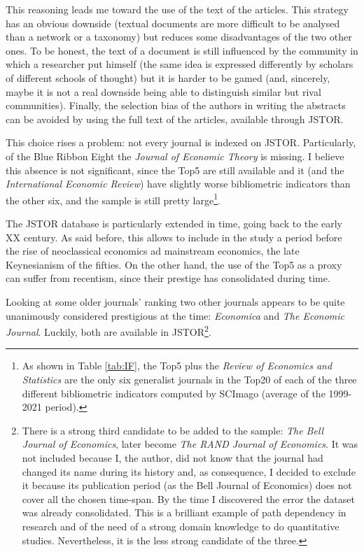 \documentclass[a4paper, 11pt, headings=standardclasses, tablecaptionsbelow]{scrartcl}
\begin{document}
This reasoning leads me toward the use of the text of the articles. This strategy has an obvious downside (textual documents are more difficult to be analysed than a network or a taxonomy) but reduces some disadvantages of the two other ones.
To be honest, the text of a document is still influenced by the community in which a researcher put himself (the same idea is expressed differently by scholars of different schools of thought) but it is harder to be gamed (and, sincerely, maybe it is not a real downside being able to distinguish similar but rival communities).
Finally, the selection bias of the authors in writing the abstracts can be avoided by using the full text of the articles, available through JSTOR.



This choice rises a problem: not every journal is indexed on JSTOR. Particularly, of the Blue Ribbon Eight the \textit{Journal of Economic Theory} is missing. I believe this absence is not significant, since the Top5 are still available and it (and the \textit{International Economic Review}) have slightly worse bibliometric indicators than the other six, and the sample is still pretty large\footnote{As shown in Table \ref{tab:IF}, the Top5 plus the \textit{Review of Economics and Statistics} are the only six generalist journals in the Top20 of each of the three different bibliometric indicators computed by SCImago (average of the 1999-2021 period).}.

The JSTOR database is particularly extended in time, going back to the early XX century. As said before, this allows to include in the study a period before the rise of neoclassical economics ad mainstream economics, the late Keynesianism of the fifties.
On the other hand, the use of the Top5 as a proxy can suffer from recentism, since their prestige has consolidated during time.

Looking at some older journals' ranking \parencite{billings1972,hawkins1973,liebowitz1984,malouin1987,moore1972,coats1971} two other journals appears to be quite unanimously considered prestigious at the time: \textit{Economica} and \textit{The Economic Journal}. Luckily, both are available in JSTOR\footnote{There is a strong third candidate to be added to the sample: \textit{The Bell Journal of Economics}, later become \textit{The RAND Journal of Economics}. It was not included because I, the author, did not know that the journal had changed its name during its history and, as consequence, I decided to exclude it because its publication period (as the Bell Journal of Economics) does not cover all the chosen time-span. By the time I discovered the error the dataset was already consolidated. This is a brilliant example of path dependency in research and of the need of a strong domain knowledge to do quantitative studies. Nevertheless, it is the less strong candidate of the three.}.
\end{document}
